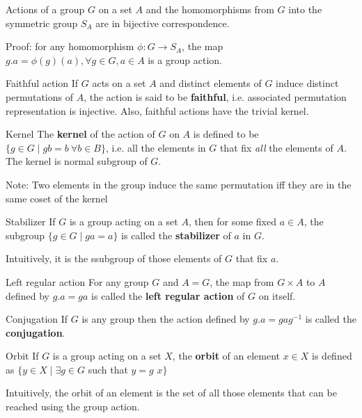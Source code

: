 \documentclass[titlepage, 12pt]{book}
\begin{document}
\begin{proposition}{}{}
Actions of a group $G$ on a set $A$ and the homomorphisms from $G$ into the
symmetric group $S_A$ are in bijective correspondence.
\end{proposition}
Proof: for any homomorphism $\phi: G\rightarrow S_A$, the map $g . a =
\phi(g)(a), \forall g\in G, a\in A$ is a group action.

\begin{definition}{Faithful action}{}
If $G$ acts on a set $A$ and distinct elements of $G$ induce distinct
permutations of $A$, the action is said to be \textbf{faithful}, i.e. associated
permutation representation is injective. Also, faithful actions have the trivial
kernel.
\end{definition}

\begin{definition}{Kernel}{}
The \textbf{kernel} of the action of $G$ on $A$ is defined to be $\{g\in G\mid
gb = b\ \forall b\in B\}$, i.e. all the elements in $G$ that fix \textit{all}
the elements of $A$. The kernel is normal subgroup of $G$.
\end{definition}

Note: Two elements in the group induce the same permutation iff they are in the
same coset of the kernel

\begin{definition}{Stabilizer}{}
If $G$ is a group acting on a set $A$, then for some fixed $a\in A$, the
subgroup $\{g\in G\mid ga=a\}$ is called the \textbf{stabilizer} of $a$ in $G$.
\end{definition}

Intuitively, it is the ssubgroup of those elements of $G$ that fix $a$.

\begin{definition}{Left regular action}{}
    For any group $G$ and $A = G$, the map from $G\times A$ to $A$ defined by
    $g.a = ga$ is called the \textbf{left regular action} of $G$ on itself.
\end{definition}

\begin{definition}{Conjugation}{}
    If $G$ is any group then the action defined by $g.a = gag^{-1}$ is called
    the \textbf{conjugation}.
\end{definition}


\begin{definition}{Orbit}{}
    If $G$ is a group acting on a set $X$, the \textbf{orbit} of an element
    $x\in X$ is defined as $\{y\in X\mid\exists g\in G$ such that $y = g$ 
    $x\}$
\end{definition}
Intuitively, the orbit of an element is the set of all those elements that can
be reached using the group action.
\end{document}
